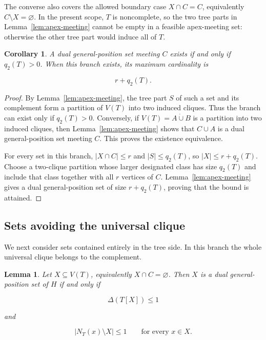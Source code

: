 \documentclass[11pt,a4paper]{article}
\newtheorem{lemma}[theorem]{Lemma}
\newtheorem{corollary}[theorem]{Corollary}
\numberwithin{equation}{section}
\begin{document}
The converse also covers the allowed boundary case \(X\cap C=C\),
equivalently \(C\setminus X=\varnothing\). In the
present scope, \(T\) is noncomplete, so the two tree parts in Lemma~\ref{lem:apex-meeting}
cannot be empty in a feasible apex-meeting set: otherwise the other tree
part would induce all of \(T\).

\begin{corollary}\label{cor:apex-meeting-maximum}
A dual general-position set meeting \(C\) exists
if and only if \(q_2(T)>0\). When this branch exists, its maximum
cardinality is

\[
r+q_2(T).
\]
\end{corollary}

\begin{proof}
By Lemma~\ref{lem:apex-meeting}, the tree part \(S\) of such a set and its
complement form a partition of \(V(T)\) into two induced cliques. Thus
the branch can exist only if \(q_2(T)>0\). Conversely, if
\(V(T)=A\mathbin{\dot\cup}B\) is a partition into two induced cliques,
then Lemma~\ref{lem:apex-meeting} shows that \(C\cup A\) is a dual general-position set
meeting \(C\). This proves the existence equivalence.

For every set in this branch, \(|X\cap C|\le r\) and \(|S|\le q_2(T)\),
so \(|X|\le r+q_2(T)\). Choose a two-clique partition whose larger
designated class has size \(q_2(T)\) and include that class together
with all \(r\) vertices of \(C\). Lemma~\ref{lem:apex-meeting} gives a dual
general-position set of size \(r+q_2(T)\), proving that the bound is
attained.
\end{proof}

\subsection{Sets avoiding the universal clique}\label{sec:apex-avoiding}

We next consider sets contained entirely in the tree side. In this
branch the whole universal clique belongs to the complement.

\begin{lemma}\label{lem:apex-avoiding}
Let \(X\subseteq V(T)\), equivalently
\(X\cap C=\varnothing\). Then \(X\) is a dual general-position set of
\(H\) if and only if

\[
\Delta(T[X])\le 1
\]

and

\[
|N_T(x)\setminus X|\le 1\qquad\text{for every }x\in X.
\]
\end{lemma}
\end{document}
